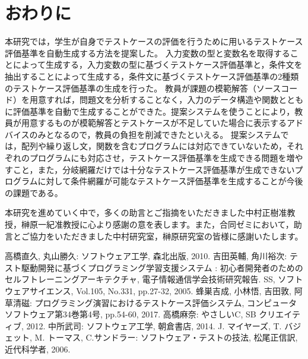 \documentclass{tpu-sotu}
\begin{document}
\chapter{おわりに}
本研究では，学生が自身でテストケースの評価を行うために用いるテストケース評価基準を自動生成する方法を提案した。
入力変数の型と変数名を取得することによって生成する，入力変数の型に基づくテストケース評価基準と，条件文を抽出することによって生成する，条件文に基づくテストケース評価基準の2種類のテストケース評価基準の生成を行った。
教員が課題の模範解答（ソースコード）を用意すれば，問題文を分析することなく，入力のデータ構造や関数とともに評価基準を自動で生成することができた。提案システムを使うことにより，教員が用意するものが模範解答とテストケースが不足していた場合に表示するアドバイスのみとなるので，教員の負担を削減できたといえる。
提案システムでは，配列や繰り返し文，関数を含むプログラムには対応できていないため，それぞれのプログラムにも対応させ，テストケース評価基準を生成できる問題を増やすこと，また，分岐網羅だけでは十分なテストケース評価基準が生成できないプログラムに対して条件網羅が可能なテストケース評価基準を生成することが今後の課題である。


\acknowledgements
本研究を進めていく中で，多くの助言とご指摘をいただきました中村正樹准教授，榊原一紀准教授に心より感謝の意を表します。また，合同ゼミにおいて，助言とご協力をいただきました中村研究室，榊原研究室の皆様に感謝いたします。
\begin{thebibliography}{3}
    高橋直久, 丸山勝久: ソフトウェア工学, 森北出版, 2010.
    吉田英輔, 角川裕次: テスト駆動開発に基づくプログラミング学習支援システム : 初心者開発者のためのセルフトレーニングアーキテクチャ, 電子情報通信学会技術研究報告. SS, ソフトウェアサイエンス, Vol.105, No.331, pp.27-32, 2005.
    蜂巣吉成, 小林悟, 吉田敦, 阿草清磁: プログラミング演習におけるテストケース評価システム, コンピュータソフトウェア第34巻第4号, pp.54-60, 2017.
    高橋麻奈: やさしいC, SB クリエイティブ, 2012.
    中所武司: ソフトウェア工学, 朝倉書店, 2014.
    J. マイヤーズ, T. バジェット, M. トーマス, C.サンドラー: ソフトウェア・テストの技法, 松尾正信訳, 近代科学者, 2006.
\end{thebibliography}
\end{document}
